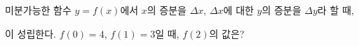 미분가능한 함수 $y=f(x)$에서 $x$의 증분을 $\Delta x$, $\Delta x$에 대한 $y$의 증분을 $\Delta y$라 할 때, \par\smallskip{}\par\smallskip\noindent 이 성립한다. $f(0)=4$, $f(1)=3$일 때, $f(2)$의 값은? 
